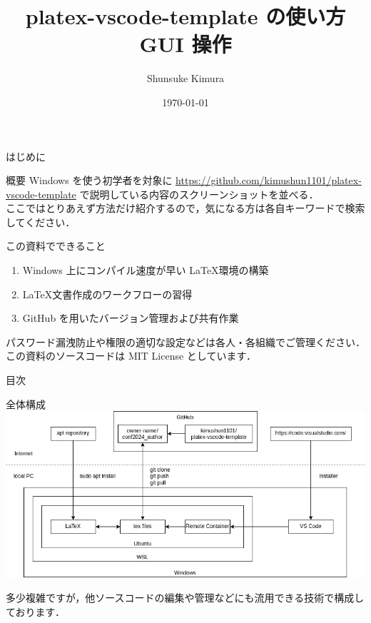 \documentclass[aspectratio=169,dvipdfmx,cjk]{beamer}
\title{platex-vscode-template の使い方 \\ GUI 操作}
\author{Shunsuke Kimura}
\date{\today}
\begin{document}
\begin{frame}
  \titlepage
\end{frame}

\begin{frame}{はじめに}
  \begin{block}{概要}
    Windows を使う初学者を対象に \href{https://github.com/kimushun1101/platex-vscode-template}{https://github.com/kimushun1101/platex-vscode-template} で説明している内容のスクリーンショットを並べる．\\
    ここではとりあえず方法だけ紹介するので，気になる方は各自キーワードで検索してください．
  \end{block}
  \begin{block}{この資料でできること}
    \begin{enumerate}
      \item Windows 上にコンパイル速度が早い \LaTeX 環境の構築
      \item \LaTeX 文書作成のワークフローの習得
      \item GitHub を用いたバージョン管理および共有作業
    \end{enumerate}
  \end{block}
  \begin{tiny}
    パスワード漏洩防止や権限の適切な設定などは各人・各組織でご管理ください．
    この資料のソースコードは MIT License としています．
  \end{tiny}
\end{frame}

\begin{frame}{目次}
  \tableofcontents
\end{frame}

\begin{frame}{全体構成}
  \centering
  \includegraphics[width=0.9\linewidth]{fig/structure.png}
  \begin{tiny}
  \end{tiny}
  多少複雑ですが，他ソースコードの編集や管理などにも流用できる技術で構成しております．
\end{frame}
\end{document}
